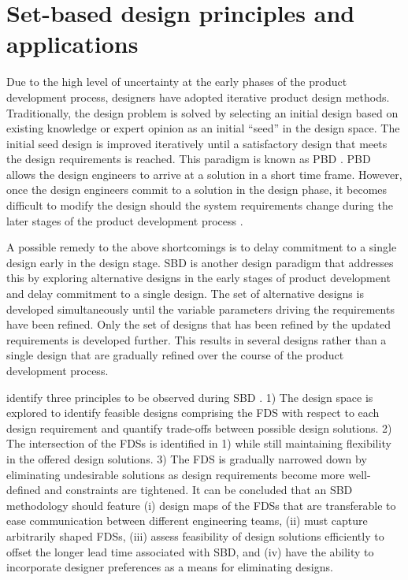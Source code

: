 \section{Set-based design principles and applications} 
\label{sec:SBD}

Due to the high level of uncertainty at the early phases of the product development process, designers have adopted iterative product design methods. Traditionally, the design problem is solved by selecting an initial design based on existing knowledge or expert opinion as an initial ``seed'' in the design space. The initial seed design is improved iteratively until a satisfactory design that meets the design requirements is reached. This paradigm is known as \ac{PBD} \cite{Qureshi2014, Kerga2014, SobekIi1999}. \ac{PBD} allows the design engineers to arrive at a solution in a short time frame. However, once the design engineers commit to a solution in the design phase, it becomes difficult to modify the design should the system requirements change during the later stages of the product development process \cite{Levandowski2014a, Carlson2000a}.

A possible remedy to the above shortcomings is to delay commitment to a single design early in the design stage. \Acf{SBD} is another design paradigm that addresses this by exploring alternative designs in the early stages of product development and delay commitment to a single design. The set of alternative designs is developed simultaneously until the variable parameters driving the requirements have been refined. Only the set of designs that has been refined by the updated requirements is developed further. This results in several designs rather than a single design that are gradually refined over the course of the product development process.

\citeauthor{SobekIi1999} identify three principles to be observed during \ac{SBD} \cite{SobekIi1999}. 1) The design space is explored to identify feasible designs comprising the \ac{FDS} with respect to each design requirement and quantify trade-offs between possible design solutions. 2) The intersection of the \acp{FDS} is identified in 1) while still maintaining flexibility in the offered design solutions. 3) The \ac{FDS} is gradually narrowed down by eliminating undesirable solutions as design requirements become more well-defined and constraints are tightened. It can be concluded that an \ac{SBD} methodology should feature (i) design maps of the \acp{FDS} that are transferable to ease communication between different engineering teams, (ii) must capture arbitrarily shaped \acp{FDS}, (iii) assess feasibility of design solutions efficiently to offset the longer lead time associated with \ac{SBD}, and (iv) have the ability to incorporate designer preferences as a means for eliminating designs.

